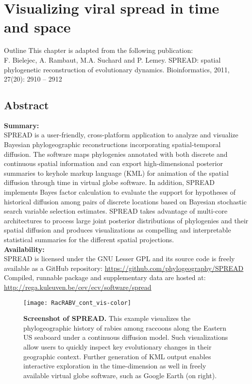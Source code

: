 \chapter{Visualizing viral spread in time and space\label{chap:spread}}

\begin{remark}{Outline}
This chapter is adapted from the following publication: \\
F. Bielejec, A. Rambaut, M.A. Suchard and P. Lemey.
SPREAD: spatial phylogenetic reconstruction of evolutionary dynamics.
Bioinformatics, 2011, 27(20): 2910 -- 2912
\end{remark}

\section{Abstract}

\textbf{Summary:}\\
SPREAD is a user-friendly, cross-platform application to analyze and visualize Bayesian phylogeographic reconstructions incorporating spatial-temporal diffusion.
The software maps phylogenies annotated with both discrete and continuous spatial information and can export high-dimensional posterior summaries to keyhole markup language (KML) for animation of the spatial diffusion through time in virtual globe software.
In addition, SPREAD implements Bayes factor calculation to evaluate the support for hypotheses of historical diffusion among pairs of discrete locations based on Bayesian stochastic search variable selection estimates.
SPREAD takes advantage of multi-core architectures to process large joint posterior distributions of phylogenies and their spatial diffusion and produces visualizations as compelling and interpretable statistical summaries for the different spatial projections.\\

\noindent
\textbf{Availability:} \\
SPREAD is licensed under the GNU Lesser GPL and its source code is freely available as a GitHub repository: \url{https://github.com/phylogeography/SPREAD} 
Compiled, runnable package and supplementary data are hosted at: \url{http://rega.kuleuven.be/cev/ecv/software/spread} 

\begin{figure}[H]
\centering
\texttt{[image: RacRABV\_cont\_vis-color]}
\caption{
{ \footnotesize 
{\bf Screenshot of SPREAD.}
This example visualizes the phylogeographic history of rabies among raccoons along the Eastern US seaboard under a continuous diffusion model.  Such visualizations allow users to quickly inspect key evolutionary changes in their geographic context.  Further generation of KML output enables interactive exploration in the time-dimension as well in freely available virtual globe software, such as {\sc Google Earth} (on right).
}%
}
\label{fig:screenshot01}
\end{figure}


